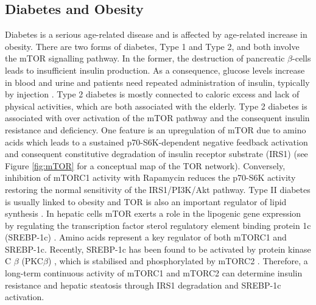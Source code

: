 \subsection{Diabetes and Obesity}
\label{subsec:Diabetes and Obesity}
Diabetes is a serious age-related disease and is affected by age-related increase in obesity. There are two forms of diabetes, Type 1 and Type 2, and both involve the mTOR signalling pathway. In the former, the destruction of pancreatic $\beta$-cells leads to insufficient insulin production. As a consequence, glucose levels increase in blood and urine and patients need repeated administration of insulin, typically by injection \citep{Lehuen2010}. Type 2 diabetes is mostly connected to caloric excess and lack of physical activities, which are both associated with the elderly. Type 2 diabetes is associated with over activation of the mTOR pathway and the consequent insulin resistance and deficiency. One feature is an upregulation of mTOR due to amino acids which leads to a sustained p70-S6K-dependent negative feedback activation and consequent constitutive degradation of insulin receptor substrate (IRS1) \citep{Dann2007, Tremblay2007, Laplante2012} (see Figure \ref{fig:mTOR} for a conceptual map of the TOR 
network). Conversely, inhibition of mTORC1 activity with Rapamycin reduces the p70-S6K activity restoring the normal sensitivity of the IRS1/PI3K/Akt pathway. Type II diabetes is usually linked to obesity and TOR is also an important regulator of lipid synthesis \citep{Rosner2008, Laplante2012}. In hepatic cells mTOR exerts a role in the lipogenic gene expression by regulating the transcription factor sterol regulatory element binding protein 1c (SREBP-1c) \citep{Peterson2011}. Amino acids represent a key regulator of both mTORC1 and SREBP-1c. Recently, SREBP-1c has been found to be activated by protein kinase C $\beta$ (PKC$\beta$) \citep{Yamamoto2010}, which is stabilised and phosphorylated by mTORC2 \citep{Ikenoue2008}. Therefore, a long-term continuous activity of mTORC1 and mTORC2 can determine insulin resistance and hepatic steatosis through IRS1 degradation and SREBP-1c activation.

